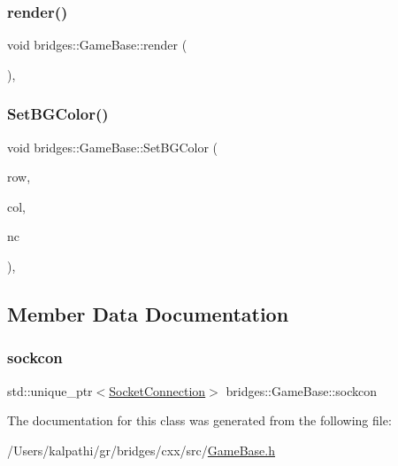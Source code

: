\mbox{\label{classbridges_1_1_game_base_a7b05208b74523a3add8502fdc7659b15}} 
\subsubsection{\texorpdfstring{render()}{render()}}
{\footnotesize\ttfamily void bridges\+::\+Game\+Base\+::render (\begin{DoxyParamCaption}{ }\end{DoxyParamCaption})\hspace{0.3cm}{\ttfamily [inline]}, {\ttfamily [protected]}}

\mbox{\label{classbridges_1_1_game_base_a640c8711f7b3465956761a4eba86c5c0}} 
\subsubsection{\texorpdfstring{SetBGColor()}{SetBGColor()}}
{\footnotesize\ttfamily void bridges\+::\+Game\+Base\+::\+Set\+B\+G\+Color (\begin{DoxyParamCaption}\item[{int}]{row,  }\item[{int}]{col,  }\item[{\mbox{\hyperlink{namespacebridges_ad811207d8898a7fd6b72a74725e68357}{Named\+Color}}}]{nc }\end{DoxyParamCaption})\hspace{0.3cm}{\ttfamily [inline]}, {\ttfamily [protected]}}



\subsection{Member Data Documentation}
\mbox{\label{classbridges_1_1_game_base_a3dfb0a0cd4d63c9ee937d4b9e7726efe}} 
\subsubsection{\texorpdfstring{sockcon}{sockcon}}
{\footnotesize\ttfamily std\+::unique\+\_\+ptr$<$\mbox{\hyperlink{classbridges_1_1_socket_connection}{Socket\+Connection}}$>$ bridges\+::\+Game\+Base\+::sockcon\hspace{0.3cm}{\ttfamily [protected]}}



The documentation for this class was generated from the following file\+:\begin{DoxyCompactItemize}
\item 
/\+Users/kalpathi/gr/bridges/cxx/src/\mbox{\hyperlink{_game_base_8h}{Game\+Base.\+h}}\end{DoxyCompactItemize}
